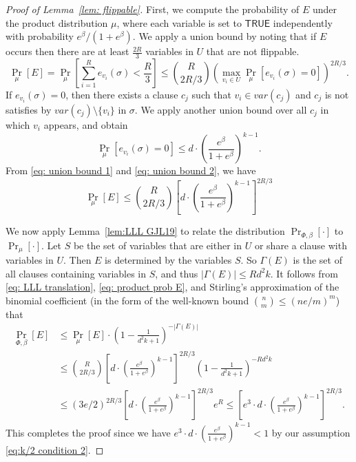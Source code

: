\documentclass[11pt]{article}
\theoremstyle{definition}
\theoremstyle{remark}
\def\TRUE{\mathsf{TRUE}}
\begin{document}
\begin{proof}[Proof of Lemma~\ref{lem: flippable}]
    First, we compute the probability of $E$ under the product distribution $\mu$, where each variable is set to $\TRUE$ independently with probability $e^\beta/(1+e^\beta)$. 
    We apply a union bound by noting that if $E$ occurs then there are at least $\frac{2R}{3}$ variables in $U$ that are not flippable.
    \begin{equation}
        \label{eq: union bound 1}
        \Pr_\mu[E]  = \Pr_\mu\left[\sum_{i=1}^R e_{v_i}(\sigma) < \frac{R}{3}\right] \le \binom{R}{2R/3} \left( \max_{v_i\in U} \Pr_\mu[e_{v_i}(\sigma) = 0] \right)^{2R/3}.
    \end{equation}
    If $e_{v_i}(\sigma) = 0$, then there exists a clause $c_j$ such that $v_i\in var(c_j)$ and $c_j$ is not satisfies by $var(c_j) \setminus \{v_i\}$ in $\sigma$.
    We apply another union bound over all $c_j$ in which $v_i$ appears, and obtain
    \begin{equation}
        \label{eq: union bound 2}
        \Pr_\mu[e_{v_i}(\sigma) = 0] \le d\cdot \left( \frac{e^\beta}{1+e^\beta} \right)^{k-1}.
    \end{equation}
    From \eqref{eq: union bound 1} and \eqref{eq: union bound 2}, we have
    \begin{equation}
        \label{eq: product prob E}
        \Pr_\mu [E] \le  \binom{R}{2R/3} 
        \left[d\cdot \left( \frac{e^\beta}{1+e^\beta} \right)^{k-1}  \right]^{2R/3}
    \end{equation}

We now apply Lemma~\ref{lem:LLL GJL19}  to relate the distribution $\Pr_{\Phi, \beta}[\cdot]$  to $\Pr_\mu[\cdot]$. 
Let $S$ be the set of variables  that are either in $U$ or share a clause with variables in $U$.  Then    $E$ is determined by   the variables $S$. 
So $\Gamma(E)$ is the set of all clauses containing variables in $S$, and thus $|\Gamma(E)| \le Rd^2k$.
    It follows from  \eqref{eq: LLL translation}, \eqref{eq: product prob E}, and Stirling's approximation of the binomial coefficient 
(in the form of the well-known bound $\binom{n}{m} \leq (ne/m)^m$)
    that
    \begin{align*}
                \Pr_{\Phi, \beta}[E] &\le \Pr_\mu[E] \cdot \left( 1 - \frac{1}{d^2 k+1} \right)^{-|\Gamma(E)|}  \\
                &\le  \binom{R}{2R/3} 
        \left[d\cdot \left( \frac{e^\beta}{1+e^\beta} \right)^{k-1}  
        \right]^{2R/3} \left( 1 - \frac{1}{d^2 k+1} \right)^{-Rd^2k} \\
        &\le 
(3e/2)^{2R/3}
\left[d\cdot \left( \frac{e^\beta}{1+e^\beta} \right)^{k-1}  
        \right]^{2R/3} e^R 
        \le \left[ e^3 \cdot d \cdot \left( \frac{e^\beta}{1+e^\beta} \right)^{k-1}  \right]^{2R/3}.
    \end{align*}
    This completes the proof since we have $
        e^3 \cdot d \cdot \left( \frac{e^\beta}{1+e^\beta} \right)^{k-1} <1$ by our assumption \eqref{eq:k/2 condition 2}.  
\end{proof}
\end{document}
